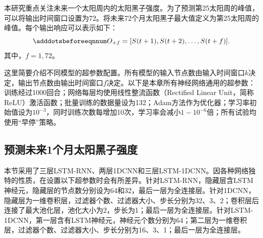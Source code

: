 本研究重点关注未来一个太阳周内的太阳黑子强度。为了预测第25太阳周的峰值，可以将输出时间窗口设置为72。将未来72个月太阳黑子最大值定义为第25太阳周的峰值。每个输出响应可以表示如下：
\begin{equation}\adddotsbeforeeqnnum
  \label{eq:ss_output}
  O_{+f}=[S(t+1),S(t+2),\ldots,S(t+f)].
\end{equation}
其中，$f=1,72$。

这里简要介绍不同模型的超参数配置。所有模型的输入节点数由输入时间窗口$k$决定，输出节点数由输出时间窗口$f$决定。以下是本章所有神经网络通用的超参数：训练经过1000回合；网络每层均使用线性整流函数（Rectified Linear Unit，简称ReLU）激活函数；批量训练的数据量设为132；Adam方法作为优化器；学习率初始值设为$10^{-3}$，同时训练次数每增加10次，学习率会减小$1-10^{-6}$倍；所有试验均使用“早停”策略。

\subsection{预测未来1个月太阳黑子强度}\label{sec:ss_result_1}

本节采用了三层LSTM-RNN、两层1DCNN和三层LSTM-1DCNN。因各种网络独特的性质，在设置以下超参数时会有所差异。针对LSTM-RNN，隐藏层含LSTM神经元，隐藏层的节点数分别设为64和32，最后一层为全连接层。针对1DCNN，隐藏层为一维卷积层，过滤器个数、过滤器大小、步长分别为32、3、2；卷积层后连接了最大池化层，池化大小为2，步长为1；最后一层为全连接层。针对LSTM-1DCNN，第一层含有LSTM神经元，神经元个数分别为64；第二层为一维卷积层，过滤器个数、过滤器大小、步长分别为16、3、1；最后一层为全连接层。 

